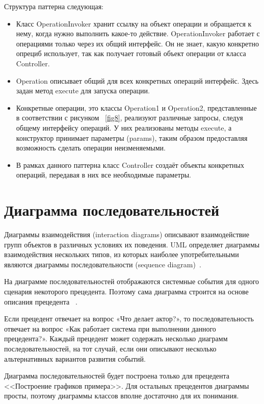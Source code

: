 \documentclass[14pt]{extreport}
\begin{document}
Структура паттерна следующая: 
\begin{itemize}
\item Класс OperationInvoker хранит ссылку на объект операции и обращается к нему, когда нужно выполнить какое-то действие. OperationInvoker работает с операциями только через их общий интерфейс. Он не знает, какую конкретно опрециб использует, так как получает готовый объект операции от класса Controller.

\item Operation описывает общий для всех конкретных операций интерфейс. Здесь задан метод execute для запуска операции.

\item Конкретные операции, это классы Operation1 и Operation2, представленные в соответствии с рисунком ~\ref{fig8}, реализуют различные запросы, следуя общему интерфейсу операций. У них реализованы методы execute, а конструктор принимает параметры (params), таким образом предоставляя возможность сделать операции неизменяемыми.

\item В рамках данного паттерна класс Controller создаёт объекты конкретных операций, передавая в них все необходимые параметры.
\end{itemize}

\section{Диаграмма последовательностей}
Диаграммы взаимодействия (interaction diagrams) описывают взаимодействие групп объектов в различных условиях их поведения. UML определяет диаграммы взаимодействия нескольких типов, из которых наиболее употребительными являются диаграммы последовательности (sequence diagram)~\cite{umlDistilled}.

На диаграмме последовательностей отображаются системные события для одного
сценария некоторого прецедента. Поэтому сама диаграмма строится на основе описания
прецедента ~\cite{umlApplying}. 

Если прецедент отвечает на вопрос «Что делает актор?», то последовательность отвечает на вопрос «Как работает система при выполнении данного прецедента?».
Каждый прецедент может содержать несколько диаграмм последовательностей, на тот случай, если они описывают несколько альтернативных вариантов развития событий.

Диаграмма последовательностей будет построена только для прецедента <<Построение графиков примера>>. Для остальных прецедентов диаграммы просты, поэтому диаграммы классов вполне достаточно для их понимания. 
\end{document}
